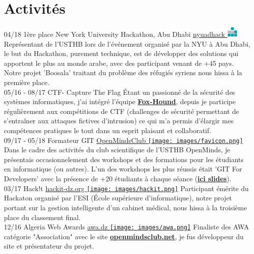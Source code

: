 \documentclass[]{friggeri-cv}
\begin{document}
\section{Activités}
\begin{entrylist}
  \entry
    {04/18}
    {1ère place New York University Hackathon, Abu Dhabi}
    {\href{http://sites.nyuad.nyu.edu/hackathon/}{nyuadhack \includegraphics[width=15pt]{images/nyuad.png}}}
    {Représentant de l'USTHB lors de l’événement organisé par la NYU à Abu Dhabi, le but du Hackathon, purement technique, est de développer des solutions qui apportent le plus au monde arabe, avec des participant venant de +45 pays. Notre projet 'Boosala' traitant du problème des réfugiés syriens nous hissa à la première place.\\}
  \entry
    {05/16 - 08/17}
    {CTF- Capture The Flag}
    {}
    {Étant un passionné de la sécurité des systèmes informatiques, j'ai intégré l'équipe \href{https://web.facebook.com/F0xHo2Nd/}{\textbf{Fox-Hound}}, depuis je participe régulièrement aux compétitions de CTF (challenges de sécurité permettant de s’entraîner aux attaques fictives d’intrusion) ce qui m'a permis d'élargir mes compétences pratiques le tout dans un esprit plaisant et collaboratif.\\}
  \entry
    {09/17 - 05/18}
    {Formateur GIT}
    {\href{http://www.openmindsclub.net}{OpenMindsClub \texttt{[image: images/favicon.png]}}}
    {Dans le cadre des activités du club scientifique de l'USTHB OpenMinds, je présentais occasionnelement des workshops et des formations pour les étudiants en informatique (ou autres). L'un des workshops les plus réussis était 'GIT For Developers' avec la présence de +20 étudiants à chaque séance (\href{https://docs.google.com/presentation/d/1EpSSNWrd8AF35Cn7sH5rNGCtWxRJZ9qw9re5kcDOY0o/edit?usp=sharing}{\textbf{ici slides}}).\\}
  \entry
    {03/17}
    {Hack!t}
    {\href{http://www.hackit-dz.org/}{hackit-dz.org  \texttt{[image: images/hackit.png]}}}
    {Participant émérite du Hackaton organisé par l'ESI (École supérieure d'informatique), notre projet portant sur la gestion intelligente d'un cabinet médical, nous hissa à la troisième place du classement final.\\}
  \entry
    {12/16}
    {Algeria Web Awards}
    {\href{https://vote.awa.dz/detail/770/}{awa.dz \texttt{[image: images/awa.png]}}}
    {Finaliste des AWA catégorie "Association" avec le site \href{http://www.openmindsclub.net/}{\textbf{openmindsclub.net}}, je fus développeur du site et présentateur du projet.\\
}
\end{entrylist}
\end{document}
